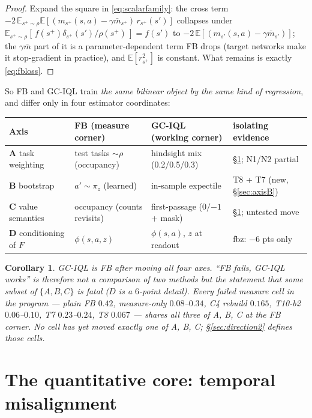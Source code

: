 \documentclass[11pt]{article}
\newcommand{\E}{\mathbb{E}}
\newtheorem{corollary}{Corollary}
\theoremstyle{definition}
\theoremstyle{remark}
\begin{document}
\begin{proof}
Expand the square in \eqref{eq:scalarfamily}: the cross term
$-2\,\E_{s^+\sim\rho}\E[(m_{s^+}(s,a)-\gamma\bar m_{s^+})\,r_{s^+}(s')]$ collapses under
$\E_{s^+\sim\rho}[\,f(s^+)\delta_{s^+}(s')/\rho(s^+)\,]=f(s')$ to
$-2\,\E[(m_{s'}(s,a)-\gamma\bar m_{s'})]$; the $\gamma\bar m$ part of it is a
parameter-dependent term FB drops (target networks make it stop-gradient in practice), and
$\E[r_{s^+}^2]$ is constant. What remains is exactly \eqref{eq:fbloss}.
\end{proof}

So FB and GC-IQL train \emph{the same bilinear object by the same kind of regression}, and
differ only in four estimator coordinates:

\begin{center}\small
\renewcommand{\arraystretch}{1.25}
\begin{tabular}{@{}l l l l@{}}
\toprule
Axis & FB (measure corner) & GC-IQL (working corner) & isolating evidence \\
\midrule
\textbf{A} task weighting & test tasks $\sim\rho$ (occupancy) & hindsight mix
(0.2/0.5/0.3) & \S\ref{sec:misalignment}; N1/N2 partial \\
\textbf{B} bootstrap & $a'\sim\pi_z$ (learned) & in-sample expectile & T8 + T7 (new,
\S\ref{sec:axisB}) \\
\textbf{C} value semantics & occupancy (counts revisits) & first-passage ($0/{-1}$ + mask)
& \S\ref{sec:misalignment}; untested move \\
\textbf{D} conditioning of $F$ & $\phi(s,a,z)$ & $\phi(s,a)$, $z$ at readout & fbz: $-6$
pts only \\
\bottomrule
\end{tabular}
\end{center}

\begin{corollary}\label{cor:corner}
GC-IQL \emph{is} FB after moving all four axes. ``FB fails, GC-IQL works'' is therefore not a
comparison of two methods but the statement that some subset of $\{A,B,C\}$ is fatal ($D$ is
a $6$-point detail). Every failed measure cell in the program --- plain FB $0.42$, measure-only
$0.08$--$0.34$, C4 rebuild $0.165$, T10-b2 $0.06$--$0.10$, T7 $0.23$--$0.24$, T8 $0.067$ ---
shares \emph{all three} of A, B, C at the FB corner. No cell has yet moved exactly one of
A, B, C; \S\ref{sec:direction2} defines those cells.
\end{corollary}

\section{The quantitative core: temporal misalignment}\label{sec:misalignment}
\end{document}

